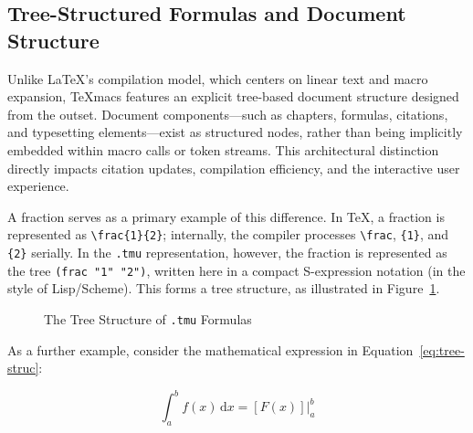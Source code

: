 \subsection{Tree-Structured Formulas and Document Structure}
\label{sec:tree-struc-on-mogan}

Unlike \LaTeX{}'s compilation model, which centers on linear text and macro expansion, \TeX{}macs features an explicit tree-based document structure designed from the outset. Document components---such as chapters, formulas, citations, and typesetting elements---exist as structured nodes, rather than being implicitly embedded within macro calls or token streams. This architectural distinction directly impacts citation updates, compilation efficiency, and the interactive user experience.

A fraction serves as a primary example of this difference. In \TeX{}, a fraction is represented as \verb|\frac{1}{2}|; internally, the compiler processes \verb|\frac|, \verb|{1}|, and \verb|{2}| serially. In the \texttt{.tmu} representation, however, the fraction is represented as the tree \verb|(frac "1" "2")|, written here in a compact S-expression notation (in the style of Lisp/Scheme). This forms a tree structure, as illustrated in Figure~\ref{fig:frac-tree}.

\begin{figure}[htbp]
    \vspace{-4mm}
    \centering
    \small
    \caption{The Tree Structure of \texttt{.tmu} Formulas}
    \label{fig:frac-tree}
\end{figure}

As a further example, consider the mathematical expression in Equation~\eqref{eq:tree-struc}:

\begin{equation}
    \label{eq:tree-struc}
    \int_{a}^{b} f(x) \, \mathrm{d}x = \left[ F(x) \right] \Big|_{a}^{b}
\end{equation}

